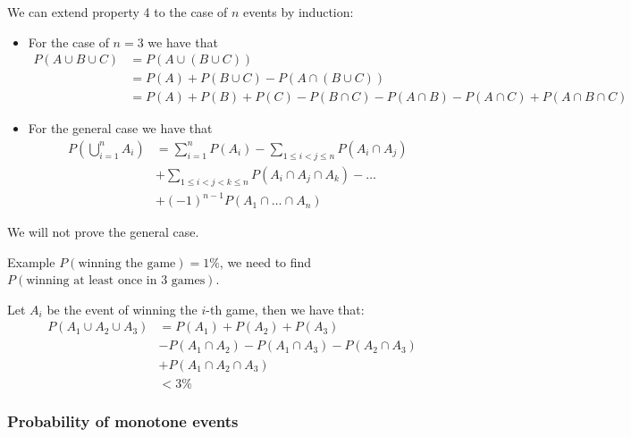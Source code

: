 \documentclass[10pt]{extarticle}
\begin{document}
We can extend property 4 to the case of $n$ events by induction:
\begin{itemize}
    \item For the case of $n = 3$ we have that
          \begin{align*}
              P(A \cup B \cup C) & = P(A \cup (B \cup C))                                                              \\
                                 & = P(A) + P(B \cup C) - P(A \cap (B \cup C))                                         \\
                                 & = P(A) + P(B) + P(C) - P(B \cap C) - P(A \cap B) - P(A \cap C) + P(A \cap B \cap C)
          \end{align*}
    \item For the general case we have that
          \begin{align*}
              P(\bigcup^n_{i=1} A_i) & = \sum^n_{i=1} P(A_i) - \sum_{1 \leq i < j \leq n} P(A_i \cap A_j) & \\
                                     & + \sum_{1 \leq i < j < k \leq n} P(A_i \cap A_j \cap A_k) - \dots    \\
                                     & + (-1)^{n-1} P(A_1 \cap \dots \cap A_n)
          \end{align*}
\end{itemize}
We will not prove the general case.

\begin{examplebox}{Example}
    $P(\text{winning the game}) = 1\%$, we need to find $P(\text{winning at least once in 3 games})$.

    Let $A_i$ be the event of winning the $i$-th game, then we have that:
    \begin{align*}
        P (A_1 \cup A_2 \cup A_3) & = P(A_1) + P(A_2) + P(A_3)                            \\
                                  & - P(A_1 \cap A_2) - P(A_1 \cap A_3) - P(A_2 \cap A_3) \\
                                  & + P(A_1 \cap A_2 \cap A_3)                            \\
                                  & < 3\%
    \end{align*}
\end{examplebox}

\subsubsection{Probability of monotone events}
\end{document}
